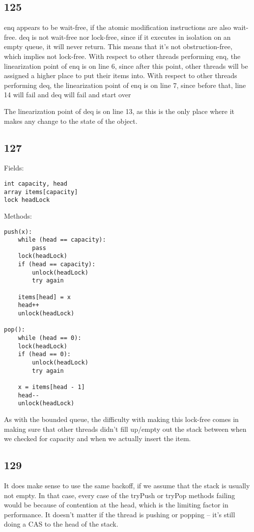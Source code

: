 \documentclass{article}
\begin{document}
\subsection*{125}
enq appears to be wait-free, if the atomic modification instructions are also wait-free. deq is not wait-free nor lock-free, since if it executes in isolation on an empty queue, it will never return. This means that it's not obstruction-free, which implies not lock-free.
With respect to other threads performing enq, the linearization point of enq is on line 6, since after this point, other threads will be assigned a higher place to put their items into. With respect to other threads performing deq, the linearization point of enq is on line 7, since before that, line 14 will fail and deq will fail and start over

The linearization point of deq is on line 13, as this is the only place where it makes any change to the state of the object.
\subsection*{127}
Fields:
\begin{verbatim}
int capacity, head
array items[capacity]
lock headLock
\end{verbatim}

Methods:
\begin{verbatim}
push(x):
    while (head == capacity):
        pass
    lock(headLock)
    if (head == capacity):
        unlock(headLock)
        try again

    items[head] = x
    head++
    unlock(headLock)

pop():
    while (head == 0):
    lock(headLock)
    if (head == 0):
        unlock(headLock)
        try again

    x = items[head - 1]
    head--
    unlock(headLock)
\end{verbatim}

As with the bounded queue, the difficulty with making this lock-free comes in making sure that other threads didn't fill up/empty out the stack between when we checked for capacity and when we actually insert the item.
\subsection*{129}
It does make sense to use the same backoff, if we assume that the stack is usually not empty. In that case, every case of the tryPush or tryPop methods failing would be because of contention at the head, which is the limiting factor in performance. It doesn't matter if the thread is pushing or popping -- it's still doing a CAS to the head of the stack.
\end{document}

